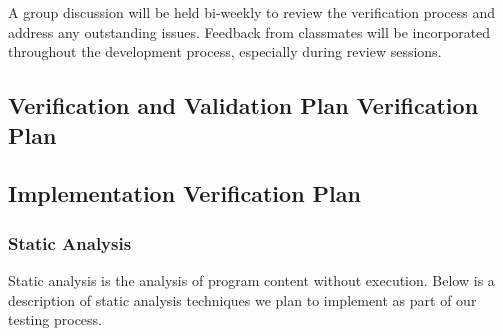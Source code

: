 \documentclass[12pt, titlepage]{article}
\begin{document}
A group discussion will be held bi-weekly to review the verification process and address any outstanding issues. Feedback from classmates will be incorporated throughout the development process, especially during review sessions.

\subsection{Verification and Validation Plan Verification Plan}




\subsection{Implementation Verification Plan}
\subsubsection{Static Analysis}
Static analysis is the analysis of program content without execution. Below is a description of static analysis techniques we plan to implement as part of our testing process.
\end{document}
